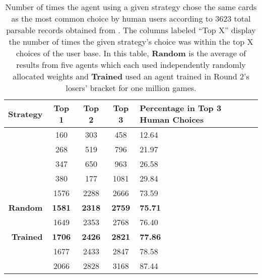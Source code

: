 
\begin{table}
	\centering

	\begin{tabular}{|r|c|c|c|p{4cm}|}
		\hline
		\textbf{Strategy} & \textbf{Top 1} & \textbf{Top 2} & \textbf{Top 3}
			& \textbf{Percentage in Top 3 Human Choices} \\
		\hline
		\peggingminavggiven & 160 & 303 & 458 & 12.64 \\\hline
		\peggingmaxmedgained & 268 & 519 & 796 & 21.97 \\\hline
		\peggingmaxavggained & 347 & 650 & 963 & 26.58 \\\hline
		\cribminavg & 380 & 177 & 1081 & 29.84 \\\hline
		\handmaxmin & 1576 & 2288 & 2666 & 73.59 \\\hline
		\textbf{Random} & \textbf{1581} & \textbf{2318} & \textbf{2759} &
			\textbf{75.71} \\\hline
		\handmaxmed & 1649 & 2353 & 2768 & 76.40 \\\hline
		\textbf{Trained} & \textbf{1706} & \textbf{2426} & \textbf{2821} &
			\textbf{77.86} \\\hline
		\handmaxposs & 1677 & 2433 & 2847 & 78.58 \\\hline
		\handmaxavg & 2066 & 2828 & 3168 & 87.44 \\\hline
	\end{tabular}
	\caption{
		Number of times the agent using a given strategy chose the same cards as
		the most common choice by human users
		according to 3623 total parsable records obtained from
		\cite{dailycribbagehand}.
		The columns labeled ``Top X'' display the number of times the given
		strategy's choice was within the top X choices of the user base.
		In this table,
		\textbf{Random} is the average of results from five agents which each used
		independently randomly allocated weights
		and
		\textbf{Trained} used an agent trained in Round 2's losers' bracket
		for one million games.
	}
	\label{tab:expts-starts-human}
\end{table}
